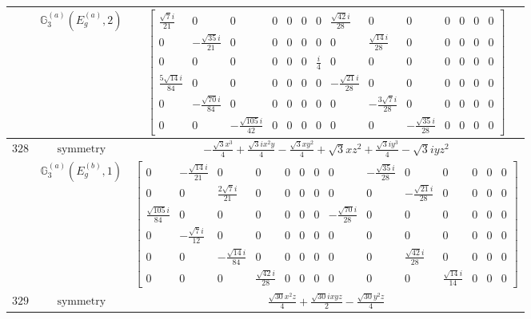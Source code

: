 \documentclass[fleqn,8pt,landscape]{jsarticle}
\begin{document}
\begin{longtable}{ccc}
$  $ & $ \mathbb{G}_{3}^{(a)}(E_{g}^{(a)},2) $ & $ \begin{bmatrix} \frac{\sqrt{7} i}{21} & 0 & 0 & 0 & 0 & 0 & 0 & \frac{\sqrt{42} i}{28} & 0 & 0 & 0 & 0 & 0 & 0 \\ 0 & - \frac{\sqrt{35} i}{21} & 0 & 0 & 0 & 0 & 0 & 0 & \frac{\sqrt{14} i}{28} & 0 & 0 & 0 & 0 & 0 \\ 0 & 0 & 0 & 0 & 0 & 0 & \frac{i}{4} & 0 & 0 & 0 & 0 & 0 & 0 & 0 \\ \frac{5 \sqrt{14} i}{84} & 0 & 0 & 0 & 0 & 0 & 0 & - \frac{\sqrt{21} i}{28} & 0 & 0 & 0 & 0 & 0 & 0 \\ 0 & - \frac{\sqrt{70} i}{84} & 0 & 0 & 0 & 0 & 0 & 0 & - \frac{3 \sqrt{7} i}{28} & 0 & 0 & 0 & 0 & 0 \\ 0 & 0 & - \frac{\sqrt{105} i}{42} & 0 & 0 & 0 & 0 & 0 & 0 & - \frac{\sqrt{35} i}{28} & 0 & 0 & 0 & 0 \end{bmatrix} $ \\ \hline
$ 328 $ & $ \text{symmetry} $ & $ - \frac{\sqrt{3} x^{3}}{4} + \frac{\sqrt{3} i x^{2} y}{4} - \frac{\sqrt{3} x y^{2}}{4} + \sqrt{3} x z^{2} + \frac{\sqrt{3} i y^{3}}{4} - \sqrt{3} i y z^{2} $ \\
$  $ & $ \mathbb{G}_{3}^{(a)}(E_{g}^{(b)},1) $ & $ \begin{bmatrix} 0 & - \frac{\sqrt{14} i}{21} & 0 & 0 & 0 & 0 & 0 & 0 & - \frac{\sqrt{35} i}{28} & 0 & 0 & 0 & 0 & 0 \\ 0 & 0 & \frac{2 \sqrt{7} i}{21} & 0 & 0 & 0 & 0 & 0 & 0 & - \frac{\sqrt{21} i}{28} & 0 & 0 & 0 & 0 \\ \frac{\sqrt{105} i}{84} & 0 & 0 & 0 & 0 & 0 & 0 & - \frac{\sqrt{70} i}{28} & 0 & 0 & 0 & 0 & 0 & 0 \\ 0 & - \frac{\sqrt{7} i}{12} & 0 & 0 & 0 & 0 & 0 & 0 & 0 & 0 & 0 & 0 & 0 & 0 \\ 0 & 0 & - \frac{\sqrt{14} i}{84} & 0 & 0 & 0 & 0 & 0 & 0 & \frac{\sqrt{42} i}{28} & 0 & 0 & 0 & 0 \\ 0 & 0 & 0 & \frac{\sqrt{42} i}{28} & 0 & 0 & 0 & 0 & 0 & 0 & \frac{\sqrt{14} i}{14} & 0 & 0 & 0 \end{bmatrix} $ \\ \hline
$ 329 $ & $ \text{symmetry} $ & $ \frac{\sqrt{30} x^{2} z}{4} + \frac{\sqrt{30} i x y z}{2} - \frac{\sqrt{30} y^{2} z}{4} $ \\

\end{longtable}
\end{document}
